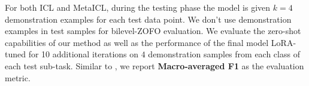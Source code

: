 For both ICL and MetaICL, during the testing phase the model is given $k=4$ demonstration examples for each test data point. We don't use demonstration examples in test samples for bilevel-ZOFO evaluation. We evaluate the zero-shot capabilities of our method as well as the performance of the final model LoRA-tuned for 10 additional iterations on $4$ demonstration samples from each class of each test sub-task. Similar to \cite{MinLZH22MetaICL}, we report \textbf{Macro-averaged F1} as the evaluation metric.

